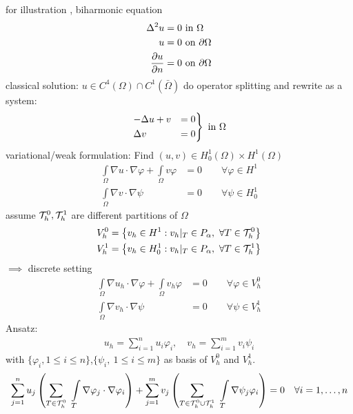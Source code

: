 \begin{example}
	for illustration , biharmonic equation
	\begin{align*}
	\Delta^2 u &= 0 \text{ in } \Omega \\
	u &= 0 \text{ on } \partial\Omega\\
	\frac{\partial u}{\partial n} &=0 \text{ on } \partial \Omega
	\end{align*}
	classical solution: $u \in C^4(\Omega)\cap C^1(\bar{\Omega})$\nl
	do operator splitting and rewrite as a system:
	\begin{align*}
		\begin{rcases}
			-\Delta u + v &=0\\
			\Delta v &= 0
		\end{rcases} \text{ in } \Omega
	\end{align*}
	variational/weak formulation: Find $(u,v) \in H^1_0(\Omega)\times H^1(\Omega)$
	\begin{align*}
		\int \limits_{\Omega} \nabla u \cdot \nabla \varphi + \int \limits_{\Omega} v\varphi &=0 \qquad \forall \varphi \in H^1\\
		\int \limits_{\Omega} \nabla v \cdot \nabla \psi &=0 \qquad \forall \psi \in H^1_0
	\end{align*}
	assume $\mathcal{T}^0_h, \mathcal{T}^1_h$ are different partitions of $\Omega$
	\begin{align*}
		V^0_h &= \left\{ v_h \in H^1: v_h|_T \in P_{\alpha},\ \forall T \in \T^0_h  \right\}\\
		V^1_h &= \left\{ v_h \in H^1_0: v_h|_T \in P_{\alpha},\ \forall T \in \T^1_h  \right\}
	\end{align*}
	$\implies$ discrete setting
	\begin{align*}
		\int \limits_{\Omega} \nabla u_h \cdot \nabla \varphi + \int \limits_{\Omega} v_h\varphi &=0 \qquad \forall \varphi \in V^0_h\\
		\int \limits_{\Omega} \nabla v_h \cdot \nabla \psi &=0 \qquad \forall \psi \in V^1_h
	\end{align*}
	Ansatz: 
	\begin{align*}
		u_h = \sum  \limits_{i=1}^{n} u_i\varphi_i,\quad v_h= \sum \limits_{i=1}^{m} v_i\psi_i
	\end{align*}
	with $\{\varphi_i,1\leq i \leq n \}$,$\{ \psi_i,\ 1 \leq i \leq m \}$ as basis of $V^0_h$ and $V^1_h$.
	\begin{align*}
		\sum \limits_{j=1}^n u_j \left( \sum \limits_{T \in \T^0_h} \ \int \limits_T \nabla \varphi_j \cdot \nabla \varphi_i \right) + \sum \limits_{j=1}^m v_j \left( \sum \limits_{T \in \T^0_h\cup \T^1_h} \ \int \limits_T \nabla \psi_j  \varphi_i \right) &=0 \quad \forall i = 1, \dots,n\\

\end{align*}
\end{example}
